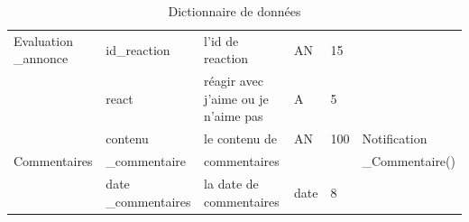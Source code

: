 \documentclass[edit,12pt,a4paper,ChapStyle,oneside,doubleinterligne]{report}
\begin{document}
\begin{table}[H]
    \centering
    \begin{tabular}{ | m{} | m{}| m{3cm} |m{}|m{}|l|}
    \hline            
                        Evaluation \_annonce&id\_reaction&l'id de reaction&AN&15& \\\cline{2-5}
                                            &react&réagir avec j'aime ou je n'aime pas&A&5& \\\hline


                                            &contenu&le contenu de &AN&100&Notification\\
                                Commentaires&\_commentaire&commentaires &  &   &\_Commentaire()\\\cline{2-6}
                                            &date \_commentaires&la date de commentaires&date&8&\\\hline

\end{tabular}
\caption{Dictionnaire de données}
\label{tab:Dictionnaire}
\end{table}
\end{document}
